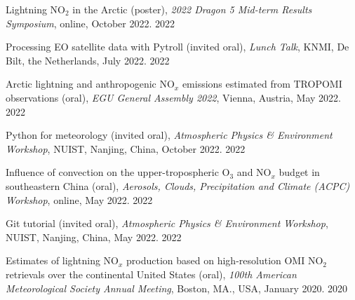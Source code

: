 

\begin{cvhonors}

\publication
{Lightning NO$_2$ in the Arctic (poster),
\emph{2022 Dragon 5 Mid-term Results Symposium},
online, October 2022.} %
{2022} %

\publication
{Processing EO satellite data with Pytroll (invited oral),
\emph{Lunch Talk},
KNMI, De Bilt, the Netherlands, July 2022.} %
{2022} %

\publication
{Arctic lightning and anthropogenic NO$_x$ emissions estimated from TROPOMI observations (oral),
\emph{EGU General Assembly 2022},
Vienna, Austria, May 2022.} %
{2022} %

\publication
{Python for meteorology (invited oral),
\emph{Atmospheric Physics \& Environment Workshop},
NUIST, Nanjing, China, October 2022.} %
{2022} %

\publication
{Influence of convection on the upper-tropospheric O$_3$ and NO$_x$ budget in southeastern China (oral),
\emph{Aerosols, Clouds, Precipitation and Climate (ACPC) Workshop},
online, May 2022.} %
{2022} %

\publication
{Git tutorial (invited oral),
\emph{Atmospheric Physics \& Environment Workshop},
NUIST, Nanjing, China, May 2022.} %
{2022} %

\publication
{Estimates of lightning NO$_x$ production based on high-resolution OMI NO$_2$ retrievals over the continental United States (oral),
\emph{100th American Meteorological Society Annual Meeting},
Boston, MA., USA, January 2020.} %
{2020} %



\end{cvhonors}
